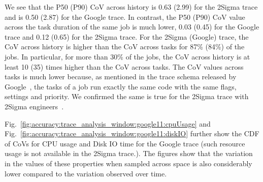We see that the P50 (P90) CoV across history is 0.63 (2.99) for the
2Sigma trace and is 0.50 (2.87) for the Google trace.
In contrast, the P50 (P90) CoV value across the task duration of the
same job is much lower, 0.03 (0.45) for the Google trace and 0.12 (0.65) for the
2Sigma trace.
%
%
{For the 2Sigma (Google) trace, the CoV across history is higher than the CoV across
  tasks for 87\% (84\%) of the jobs.
  In particular, for more than 30\% of the jobs,
  the CoV across history is at least 10 (35) times higher than the CoV across tasks.
}
The CoV values across tasks is much lower
because, as
mentioned in the trace schema released by
Google~\cite{googleClusterData2011-2Schema}, the tasks of a job run
exactly the same code with the same flags, settings and priority.
{We confirmed the same is true for the 2Sigma trace
with 2Sigma {engineers}~\cite{personalCommunication:MarkAstley}.  }

{Fig.~\ref{fig:accuracy:trace_analysis_window:google11:cpuUsage} and
Fig.~\ref{fig:accuracy:trace_analysis_window:google11:diskIO} further show the
CDF of CoVs for CPU usage and Disk IO time for the Google trace (such resource
usage is not available in the 2Sigma trace.).
%
The figures show that the variation in the values of these properties when
sampled across space is also considerably lower compared to the variation
observed over time.
}


